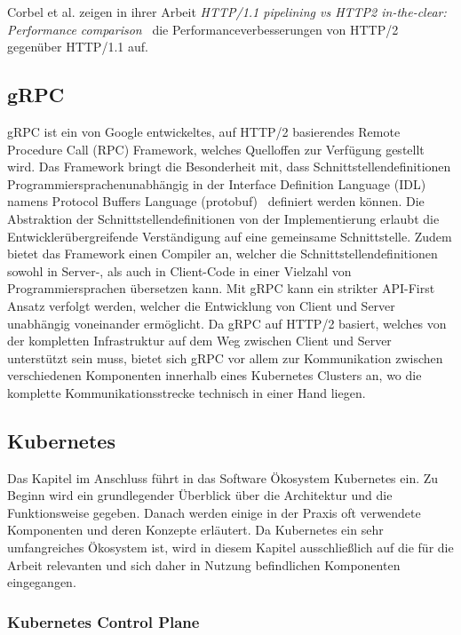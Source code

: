 Corbel et al. zeigen in ihrer Arbeit \textit{HTTP/1.1 pipelining vs HTTP2 in-the-clear: Performance comparison}~\cite{7745823} die Performanceverbesserungen von HTTP/2 gegenüber HTTP/1.1 auf.

\subsection{gRPC}\label{subsec:grpc}
gRPC ist ein von Google entwickeltes, auf HTTP/2 basierendes Remote Procedure Call (RPC) Framework, welches Quelloffen zur Verfügung gestellt wird.
Das Framework bringt die Besonderheit mit, dass Schnittstellendefinitionen Programmiersprachenunabhängig in der Interface Definition Language (IDL) namens Protocol Buffers Language (protobuf)~\cite{protobuf} definiert werden können.
Die Abstraktion der Schnittstellendefinitionen von der Implementierung erlaubt die Entwicklerübergreifende Verständigung auf eine gemeinsame Schnittstelle.
Zudem bietet das Framework einen Compiler an, welcher die Schnittstellendefinitionen sowohl in Server-, als auch in Client-Code in einer Vielzahl von Programmiersprachen übersetzen kann.
Mit gRPC kann ein strikter API-First Ansatz verfolgt werden, welcher die Entwicklung von Client und Server unabhängig voneinander ermöglicht.
Da gRPC auf HTTP/2 basiert, welches von der kompletten Infrastruktur auf dem Weg zwischen Client und Server unterstützt sein muss, bietet sich gRPC vor allem zur Kommunikation zwischen verschiedenen Komponenten innerhalb eines Kubernetes Clusters an, wo die komplette Kommunikationsstrecke technisch in einer Hand liegen.

\subsection{Kubernetes}\label{subsec:kubernetes}
Das Kapitel im Anschluss führt in das Software Ökosystem Kubernetes ein.
Zu Beginn wird ein grundlegender Überblick über die Architektur und die Funktionsweise gegeben.
Danach werden einige in der Praxis oft verwendete Komponenten und deren Konzepte erläutert.
Da Kubernetes ein sehr umfangreiches Ökosystem ist, wird in diesem Kapitel ausschließlich auf die für die Arbeit relevanten und sich daher in Nutzung befindlichen Komponenten eingegangen.

\subsubsection{Kubernetes Control Plane}

